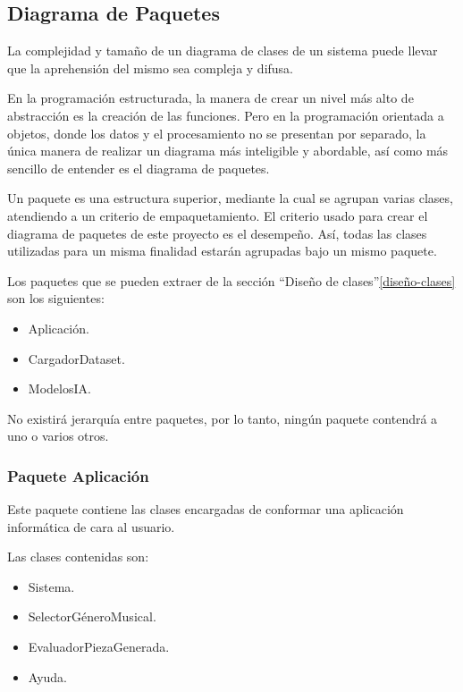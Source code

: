 
\subsection{Diagrama de Paquetes}

La complejidad y tamaño de un diagrama de clases de un sistema puede llevar que la aprehensión del mismo sea compleja y difusa.

En la programación estructurada, la manera de crear un nivel más alto de abstracción es la creación de las funciones. Pero en la programación orientada a objetos, donde los datos y el procesamiento no se presentan por separado, la única manera de realizar un diagrama más inteligible y abordable, así como más sencillo de entender es el diagrama de paquetes.

Un paquete es una estructura superior, mediante la cual se agrupan varias clases, atendiendo a un criterio de empaquetamiento. El criterio usado para crear el diagrama de paquetes de este proyecto es el desempeño. Así, todas las clases utilizadas para un misma finalidad estarán agrupadas bajo un mismo paquete.

Los paquetes que se pueden extraer de la sección ``Diseño de clases''\ref{diseño-clases} son los siguientes:

\begin{itemize}
    \item Aplicación.
    \item CargadorDataset.
    \item ModelosIA.
\end{itemize}

No existirá jerarquía entre paquetes, por lo tanto, ningún paquete contendrá a uno o varios otros.

\subsubsection{Paquete Aplicación}
Este paquete contiene las clases encargadas de conformar una aplicación informática de cara al usuario. 

Las clases contenidas son:

\begin{itemize}
  \item Sistema.
  \item SelectorGéneroMusical.
  \item EvaluadorPiezaGenerada.
  \item Ayuda.
\end{itemize}

